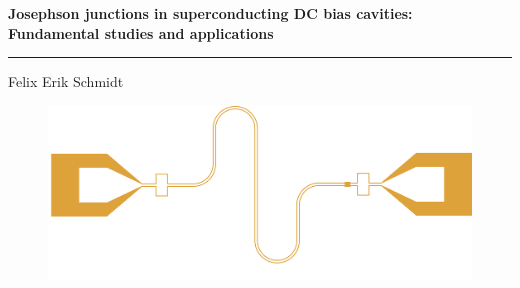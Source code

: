 \documentclass{dissertation-edit}
\begin{document}
{\linespread{1.1}\raggedright\bfseries\Huge Josephson junctions in superconducting DC bias cavities:\\
	Fundamental studies and applications\par
\vspace{0.5cm}
\hrule height 2pt
\vspace{0.5cm}
\normalfont\LARGE Felix Erik Schmidt	
}
\begin{figure}[b]
	\includegraphics[width=\linewidth]{../title/cover_circuit/nazca_export_post.pdf}
\end{figure}


\end{document}

